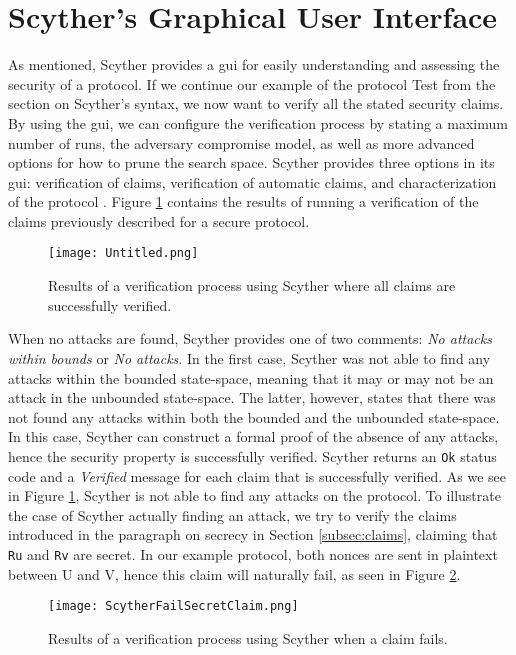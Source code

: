 \section{Scyther's Graphical User Interface}

As mentioned, Scyther provides a \gls{gui} for easily understanding and assessing the security of a protocol. If we continue our example of the protocol Test from the section on Scyther's syntax, we now want to verify all the stated security claims. By using the \gls{gui}, we can configure the verification process by stating a maximum number of runs, the adversary compromise model, as well as more advanced options for how to prune the search space. Scyther provides three options in its \gls{gui}: verification of claims, verification of automatic claims, and characterization of the protocol \cite{cremers2008scyther}. Figure \ref{fig:scyther-verify-claims} contains the results of running a verification of the claims previously described for a secure protocol.

\begin{figure}[h]
	\centering
	\texttt{[image: Untitled.png]}
	\caption{Results of a verification process using Scyther where all claims are successfully verified.}
	\label{fig:scyther-verify-claims}
\end{figure}

When no attacks are found, Scyther provides one of two comments: \emph{No attacks within bounds} or \emph{No attacks}. In the first case, Scyther was not able to find any attacks within the bounded state-space, meaning that it may or may not be an attack in the unbounded state-space. The latter, however, states that there was not found any attacks within both the bounded and the unbounded state-space. In this case, Scyther can construct a formal proof of the absence of any attacks, hence the security property is successfully verified. Scyther returns an \texttt{Ok} status code and a \emph{Verified} message for each claim that is successfully verified. As we see in Figure \ref{fig:scyther-verify-claims}, Scyther is not able to find any attacks on the protocol. To illustrate the case of Scyther actually finding an attack, we try to verify the claims introduced in the paragraph on secrecy in Section \ref{subsec:claims}, claiming that \texttt{Ru} and \texttt{Rv} are secret. In our example protocol, both nonces are sent in plaintext between U and V, hence this claim will naturally fail, as seen in Figure \ref{fig:scyther-verify-claims-fail}.


\begin{figure}[h]
	\centering
	\texttt{[image: ScytherFailSecretClaim.png]}
	\caption{Results of a verification process using Scyther when a claim fails.}
	\label{fig:scyther-verify-claims-fail}
\end{figure}

